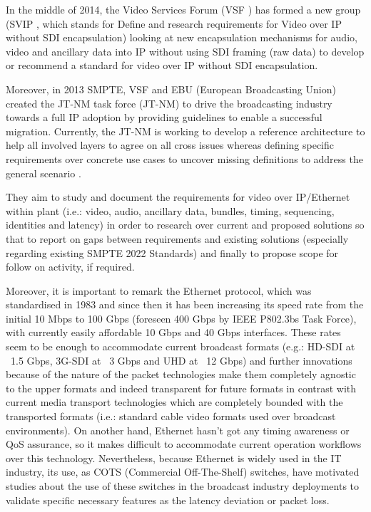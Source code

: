 In the middle of 2014, the Video Services Forum (VSF \cite{VSF}) has formed a new group (SVIP \cite{SVIP}, which stands for Define and research requirements for Video over IP without SDI encapsulation) looking at new encapsulation mechanisms for audio, video and ancillary data into IP without using SDI framing (raw data) to develop or recommend a standard for video over IP without SDI encapsulation.

Moreover, in 2013 SMPTE, VSF and EBU (European Broadcasting Union) created the JT-NM task force (JT-NM) to drive the broadcasting industry towards a full IP adoption by providing guidelines to enable a successful migration. Currently, the JT-NM is working to develop a reference architecture to help all involved layers to agree on all cross issues whereas defining specific requirements over concrete use cases to uncover missing definitions to address the general scenario \cite{jtnm}.

They aim to study and document the requirements for video over IP/Ethernet within plant (i.e.: video, audio, ancillary data, bundles, timing, sequencing, identities and latency) in order to research over current and proposed solutions so that to report on gaps between requirements and existing solutions (especially regarding existing SMPTE 2022 Standards) and finally to propose scope for follow on activity, if required.

Moreover, it is important to remark the Ethernet \cite{eth} protocol, which was standardised in 1983 and since then it has been increasing its speed rate from the initial 10 Mbps to 100 Gbps (foreseen 400 Gbps by IEEE P802.3bs \cite{ethbs} Task Force), with currently easily affordable 10 Gbps and 40 Gbps interfaces. These rates seem to be enough to accommodate current broadcast formats (e.g.: HD-SDI at ~1.5 Gbps, 3G-SDI at ~3 Gbps and UHD at ~12 Gbps) and further innovations because of the nature of the packet technologies make them completely agnostic to the upper formats and indeed transparent for future formats in contrast with current media transport technologies which are completely bounded with the transported formats (i.e.: standard cable video formats used over broadcast environments). On another hand, Ethernet hasn't got any timing awareness or QoS assurance, so it makes difficult to accommodate current operation workflows over this technology. Nevertheless, because Ethernet is widely used in the IT industry, its use, as COTS (Commercial Off-The-Shelf) switches, have motivated studies about the use of these switches in the broadcast industry deployments to validate specific necessary features as the latency deviation or packet loss.

